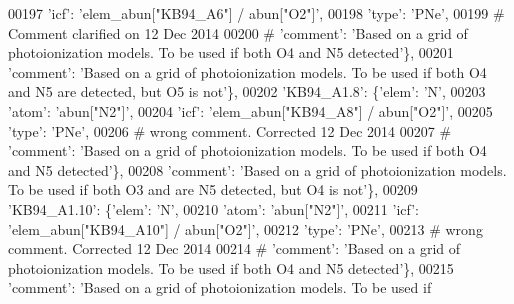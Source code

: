 \begin{DoxyCode}
00197                                      \textcolor{stringliteral}{'icf'}: \textcolor{stringliteral}{'elem\_abun["KB94\_A6"]  / abun["O2"]'},
00198                                      \textcolor{stringliteral}{'type'}: \textcolor{stringliteral}{'PNe'},
00199 \textcolor{comment}{# Comment clarified on 12 Dec 2014 }
00200 \textcolor{comment}{#                                      'comment': 'Based on a grid of photoionization models. To be used if
       both O4 and N5 detected'\},}
00201                                       \textcolor{stringliteral}{'comment'}: \textcolor{stringliteral}{'Based on a grid of photoionization models. To be used if
       both O4 and N5 are detected, but O5 is not'}\},
00202                          \textcolor{stringliteral}{'KB94\_A1.8'}: \{\textcolor{stringliteral}{'elem'}: \textcolor{stringliteral}{'N'},
00203                                      \textcolor{stringliteral}{'atom'}: \textcolor{stringliteral}{'abun["N2"]'},
00204                                      \textcolor{stringliteral}{'icf'}: \textcolor{stringliteral}{'elem\_abun["KB94\_A8"]  / abun["O2"]'},
00205                                      \textcolor{stringliteral}{'type'}: \textcolor{stringliteral}{'PNe'},
00206 \textcolor{comment}{# wrong comment. Corrected 12 Dec 2014}
00207 \textcolor{comment}{#                                     'comment': 'Based on a grid of photoionization models. To be used if
       both O4 and N5 detected'\},}
00208                                      \textcolor{stringliteral}{'comment'}: \textcolor{stringliteral}{'Based on a grid of photoionization models. To be used if
       both O3 and are N5 detected, but O4 is not'}\},
00209                          \textcolor{stringliteral}{'KB94\_A1.10'}: \{\textcolor{stringliteral}{'elem'}: \textcolor{stringliteral}{'N'},
00210                                      \textcolor{stringliteral}{'atom'}: \textcolor{stringliteral}{'abun["N2"]'},
00211                                      \textcolor{stringliteral}{'icf'}: \textcolor{stringliteral}{'elem\_abun["KB94\_A10"]  / abun["O2"]'},
00212                                      \textcolor{stringliteral}{'type'}: \textcolor{stringliteral}{'PNe'},
00213 \textcolor{comment}{# wrong comment. Corrected 12 Dec 2014}
00214 \textcolor{comment}{#                                      'comment': 'Based on a grid of photoionization models. To be used if
       both O4 and N5 detected'\},}
00215                                       \textcolor{stringliteral}{'comment'}: \textcolor{stringliteral}{'Based on a grid of photoionization models. To be used if
}
\end{DoxyCode}
